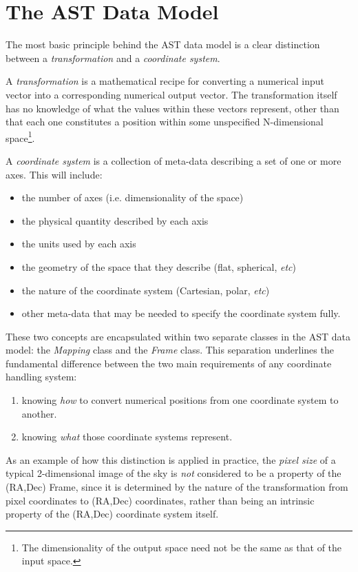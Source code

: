 \documentclass[final,authoryear,5p,times,twocolumn]{elsarticle}
\begin{document}
\section{The AST Data Model}
\label{sec:model}

The most basic principle behind the AST data model is a clear distinction
between a \emph{transformation} and a \emph{coordinate system}.

A \emph{transformation} is a mathematical recipe for converting a numerical
input vector into a corresponding numerical output vector. The
transformation itself has no knowledge of what the values within these
vectors represent, other than that each one constitutes a position within
some unspecified N-dimensional space\footnote{The dimensionality of the
output space need not be the same as that of the input space.}.

A \emph{coordinate system} is a collection of meta-data describing a set of
one or more axes. This will include:
\begin{itemize}
\item the number of axes (i.e. dimensionality of the space)
\item the physical quantity described by each axis
\item the units used by each axis
\item the geometry of the space that they describe (flat, spherical,
\emph{etc})
\item the nature of the coordinate system (Cartesian, polar, \emph{etc})
\item other meta-data that may be needed to specify the coordinate system
fully.
\end{itemize}

These two concepts are encapsulated within two separate classes in the
AST data model: the \emph{Mapping} class and the \emph{Frame} class. This
separation underlines the fundamental difference between the two main
requirements of any coordinate handling system:

\begin{enumerate}
\item knowing \emph{how} to convert numerical positions from one coordinate
system to another.
\item knowing \emph{what} those coordinate systems represent.
\end{enumerate}

As an example of how this distinction is applied in practice, the
\emph{pixel size} of a typical 2-dimensional image of the sky is
\emph{not} considered to be a property of the (RA,Dec) Frame, since it is
determined by the nature of the transformation from pixel coordinates to
(RA,Dec) coordinates, rather than being an intrinsic property of the (RA,Dec)
coordinate system itself.
\end{document}
